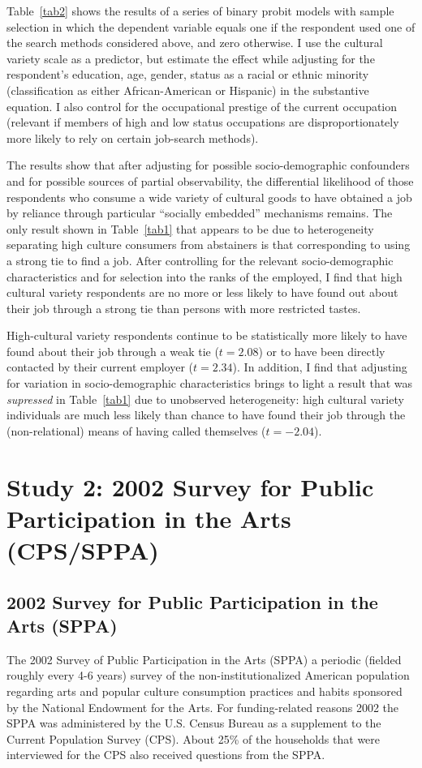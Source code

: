 \documentclass[12pt]{article}
\begin{document}
Table~\ref{tab2} shows the results of a series of binary probit models with sample selection in which the dependent variable equals one if the respondent used one of the search methods considered above, and zero otherwise.  I use the cultural variety scale as a predictor, but estimate the effect while adjusting for the respondent's education, age, gender, status as a racial or ethnic minority (classification as either African-American or Hispanic) in the substantive equation.  I also control for the occupational prestige of the current occupation (relevant if members of high and low status occupations are disproportionately more likely to rely on certain job-search methods).

The results show that after adjusting for possible socio-demographic confounders and for possible sources of partial observability, the differential likelihood of those respondents who consume a wide variety of cultural goods to have obtained a job by reliance through particular ``socially embedded'' mechanisms remains.  The only result shown in Table~\ref{tab1} that appears to be due to heterogeneity separating high culture consumers from abstainers is that corresponding to using a strong tie to find a job.  After controlling for the relevant socio-demographic characteristics and for selection into the ranks of the employed, I find that high cultural variety respondents are no more or less likely to have found out about their job through a strong tie than persons with more restricted tastes. 

High-cultural variety respondents continue to be statistically more likely to have found about their job through a weak tie ($t=2.08$) or to have been directly contacted by their current employer ($t=2.34$). In addition, I find that adjusting for variation in socio-demographic characteristics brings to light a result that was {\em supressed} in Table~\ref{tab1} due to unobserved heterogeneity:  high cultural variety individuals are much less likely than chance to have found their job through the (non-relational) means of having called themselves ($t=-2.04$).

\section{Study 2:  2002 Survey for Public Participation in the Arts (CPS/SPPA)}
\subsection{2002 Survey for Public Participation in the Arts (SPPA)} 
The 2002 Survey of Public Participation in the Arts (SPPA) a periodic (fielded roughly every 4-6 years) survey of the non-institutionalized American population regarding arts and popular culture consumption practices and habits sponsored by the National Endowment for the Arts. For funding-related reasons 2002 the SPPA was administered by the U.S. Census Bureau as a supplement to the Current Population Survey (CPS). About 25\% of the households that were interviewed for the CPS also received questions from the SPPA.
\end{document}
